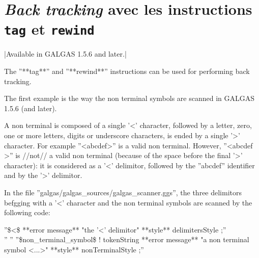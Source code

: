 {\section{\emph{Back tracking} avec les instructions \texttt{tag} et \texttt{rewind}}

|Available in GALGAS 1.5.6 and later.|

The ''**tag**'' and ''**rewind**'' instructions can be used for performing back tracking.

The first example is the way the non terminal symbols are scanned in GALGAS 1.5.6 (and later).

A non terminal is composed of a single '<' character, followed by a letter, zero, one or more letters, digits or underscore characters, is ended by a single '>' character. For example ''<abcdef>'' is a valid non terminal. However, ''<abcdef >'' is //not// a valid non terminal (because of the space before the final '>' character): it is considered as a '<' delimitor, followed by the ''abcdef'' identifier and by the '>' delimitor.

In the file ''galgas/galgas\_sources/galgas\_scanner.ggs'', the three delimitors befgging with a '<' character and the non terminal symbols are scanned by the following code:

''\$<\$ **error message** "the '<' delimitor" **style** delimitersStyle ;''\\
''%
''%
''\$non\_terminal\_symbol\$ ! tokenString **error message** "a non terminal symbol <...>" **style** nonTerminalStyle ;''\\

}
